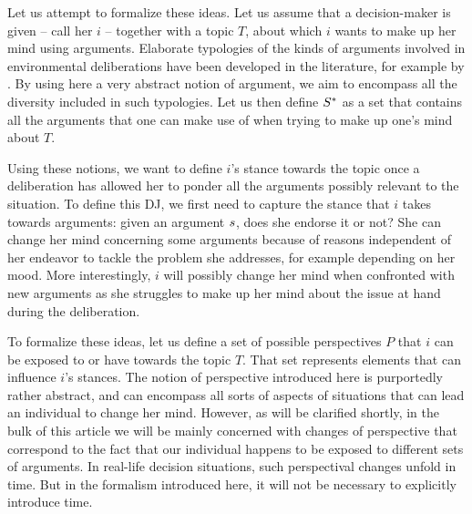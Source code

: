 \documentclass[version=3.21, pagesize, twoside=off, bibliography=totoc, DIV=calc, fontsize=12pt, a4paper, french, english]{scrartcl}
\begin{document}
Let us attempt to formalize these ideas. 
Let us assume that a decision-maker is given -- call her $i$ -- together with a topic $T$, about which $i$ wants to make up her mind using arguments. 
Elaborate typologies of the kinds of arguments involved in environmental deliberations have been developed in the literature, for example by \citet{chateauraynaud_contrainte_2007}. 
By using here a very abstract notion of argument, we aim to encompass all the diversity included in such typologies. 
Let us then define $S^*$ as a set that contains all the arguments that one can make use of when trying to make up one’s mind about $T$.

Using these notions, we want to define $i$’s stance towards the topic once a deliberation has allowed her to ponder all the arguments possibly relevant to the situation. 
To define this \ac{DJ}, we first need to capture the stance that $i$ takes towards arguments: given an argument $s$, does she endorse it or not? 
She can change her mind concerning some arguments because of reasons independent of her endeavor to tackle the problem she addresses, for example depending on her mood. 
More interestingly, $i$ will possibly change her mind when confronted with new arguments as she struggles to make up her mind about the issue at hand during the deliberation.

To formalize these ideas, let us define a set of possible perspectives $P$ that $i$ can be exposed to or have towards the topic $T$. 
That set represents elements that can influence $i$’s stances. 
The notion of perspective introduced here is purportedly rather abstract, and can encompass all sorts of aspects of situations that can lead an individual to change her mind. 
However, as will be clarified shortly, in the bulk of this article we will be mainly concerned with changes of perspective that correspond to the fact that our individual happens to be exposed to different sets of arguments. 
In real-life decision situations, such perspectival changes unfold in time. 
But in the formalism introduced here, it will not be necessary to explicitly introduce time.
\end{document}
